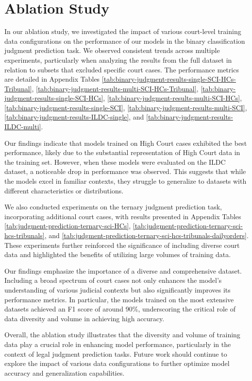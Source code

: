 \section{Ablation Study}
In our ablation study, we investigated the impact of various court-level training data configurations on the performance of our models in the binary classification judgment prediction task. We observed consistent trends across multiple experiments, particularly when analyzing the results from the full \texttt{\named} dataset in relation to subsets that excluded specific court cases. The performance metrics are detailed in Appendix Tables \ref{tab:binary-judgment-results-single-SCI-HCs-Tribunal}, \ref{tab:binary-judgment-results-multi-SCI-HCs-Tribunal}, \ref{tab:binary-judgment-results-single-SCI-HCs}, \ref{tab:binary-judgment-results-multi-SCI-HCs}, \ref{tab:binary-judgment-results-single-SCI}, \ref{tab:binary-judgment-results-multi-SCI}, \ref{tab:binary-judgment-results-ILDC-single}, and \ref{tab:binary-judgment-results-ILDC-multi}. 

Our findings indicate that models trained on High Court cases exhibited the best performance, likely due to the substantial representation of High Court data in the training set. However, when these models were evaluated on the ILDC dataset, a noticeable drop in performance was observed. This suggests that while the models excel in familiar contexts, they struggle to generalize to datasets with different characteristics or distributions.

We also conducted experiments on the ternary judgment prediction task, incorporating additional court cases, with results presented in Appendix Tables \ref{tab:judgment-prediction-ternary-sci-HCs}, \ref{tab:judgment-prediction-ternary-sci-hcs-tribunals}, and \ref{tab:judgment-prediction-ternary-sci-hcs-tribunals-dailyorders}. These experiments further reinforced the significance of including diverse court data and highlighted the benefits of utilizing large volumes of training data. 

Our findings emphasize the importance of a diverse and comprehensive dataset. Including a broad spectrum of court cases not only enhances the model's understanding of various judicial contexts but also significantly improves its performance metrics. In particular, the models trained on the most extensive datasets achieved an F1 score of around 90\%, underscoring the critical role of data diversity and volume in achieving high accuracy.

Overall, the ablation study illustrates that the diversity and volume of training data play a crucial role in enhancing model performance, particularly in the context of legal judgment prediction tasks. Future work should continue to explore the impact of various data configurations to further optimize model accuracy and generalization capabilities.

